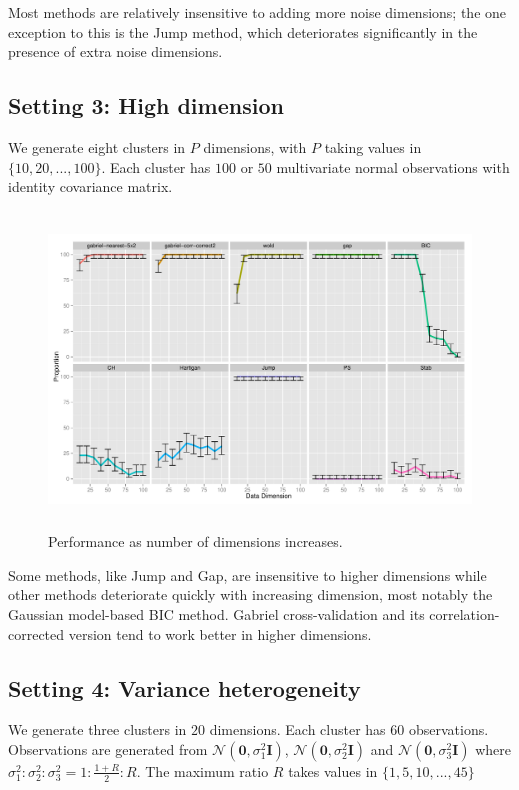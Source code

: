\documentclass[12pt]{article}
\begin{document}
Most methods are relatively insensitive to adding more noise dimensions; the
one exception to this is the Jump method, which deteriorates significantly in
the presence of extra noise dimensions.


\subsection{Setting 3: High dimension}

We generate eight clusters in $P$ dimensions, with $P$ taking values in
$\{10,20,...,100\}$.  Each cluster has $100$ or $50$ multivariate
normal observations with identity covariance matrix. 
	
\begin{figure}[H]
\centering
\includegraphics[width=5.5in, height=3.3in]{New simulation/demo/bench/setting3/Facet.pdf}
\caption{Performance as number of dimensions increases.}
\label{fig:setting3}
\end{figure}

Some methods, like Jump and Gap, are insensitive to higher dimensions while
other methods deteriorate quickly with increasing dimension, most notably the
Gaussian model-based BIC method.  Gabriel cross-validation and its
correlation-corrected version tend to work better in higher dimensions.
	

\subsection{Setting 4: Variance heterogeneity}

We generate three clusters in $20$ dimensions. Each cluster has $60$
observations.  Observations are generated from
$\mathcal{N}\left(\mathbf{0},\sigma_1^2\mathbf{I}\right)$,
$\mathcal{N}\left(\mathbf{0},\sigma_2^2\mathbf{I}\right)$ and
$\mathcal{N}\left(\mathbf{0},\sigma_3^2\mathbf{I}\right)$ where $\sigma_1^2 :
\sigma_2^2: \sigma_3^2 = 1:\frac{1+R}{2}:R$. The maximum ratio $R$ takes
values in $\{1,5,10,...,45\}$
	
\end{document}
